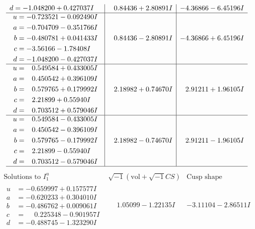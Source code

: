 \documentclass[1p]{elsarticle_modified}
\theoremstyle{definition}
\newcommand{\I}{\sqrt{-1}}
\begin{document}
$$\begin{array}{c|c|c}
\begin{aligned}
d &= -1.048200 + 0.427037 I\end{aligned}
 & \phantom{-}0.84436 + 2.80891 I & -4.36866 - 6.45196 I \\ \hline\begin{aligned}
u &= -0.723521 - 0.092490 I \\
a &= -0.704709 - 0.351766 I \\
b &= -0.480781 + 0.041433 I \\
c &= -3.56166 - 1.78408 I \\
d &= -1.048200 - 0.427037 I\end{aligned}
 & \phantom{-}0.84436 - 2.80891 I & -4.36866 + 6.45196 I \\ \hline\begin{aligned}
u &= \phantom{-}0.549584 + 0.433005 I \\
a &= \phantom{-}0.450542 + 0.396109 I \\
b &= \phantom{-}0.579765 + 0.179992 I \\
c &= \phantom{-}2.21899 + 0.55940 I \\
d &= \phantom{-}0.703512 + 0.579046 I\end{aligned}
 & \phantom{-}2.18982 + 0.74670 I & \phantom{-}2.91211 + 1.96105 I \\ \hline\begin{aligned}
u &= \phantom{-}0.549584 - 0.433005 I \\
a &= \phantom{-}0.450542 - 0.396109 I \\
b &= \phantom{-}0.579765 - 0.179992 I \\
c &= \phantom{-}2.21899 - 0.55940 I \\
d &= \phantom{-}0.703512 - 0.579046 I\end{aligned}
 & \phantom{-}2.18982 - 0.74670 I & \phantom{-}2.91211 - 1.96105 I\\
 \hline 
 \end{array}$$\newpage$$\begin{array}{c|c|c}  
\text{Solutions to }I^u_{1}& \I (\text{vol} + \sqrt{-1}CS) & \text{Cusp shape}\\
 \hline 
\begin{aligned}
u &= -0.659997 + 0.157577 I \\
a &= -0.620233 + 0.304010 I \\
b &= -0.486762 + 0.009061 I \\
c &= \phantom{-}0.225348 - 0.901957 I \\
d &= -0.488745 - 1.323290 I\end{aligned}
 & \phantom{-}1.05099 - 1.22135 I & -3.11104 - 2.86511 I \\ \hline\begin{aligned}

\end{aligned}
\end{array}$$
\end{document}
